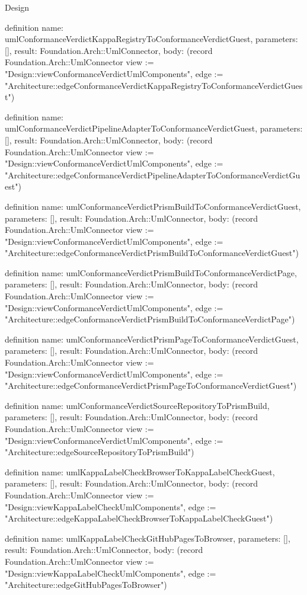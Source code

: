 \begin{lexlean}{Design}
\begin{semanticmodule}
definition{
  name: umlConformanceVerdictKappaRegistryToConformanceVerdictGuest,
  parameters: [],
  result: Foundation.Arch::UmlConnector,
  body: (record Foundation.Arch::UmlConnector {view := "Design::viewConformanceVerdictUmlComponents", edge := "Architecture::edgeConformanceVerdictKappaRegistryToConformanceVerdictGuest"})
}

definition{
  name: umlConformanceVerdictPipelineAdapterToConformanceVerdictGuest,
  parameters: [],
  result: Foundation.Arch::UmlConnector,
  body: (record Foundation.Arch::UmlConnector {view := "Design::viewConformanceVerdictUmlComponents", edge := "Architecture::edgeConformanceVerdictPipelineAdapterToConformanceVerdictGuest"})
}

definition{
  name: umlConformanceVerdictPrismBuildToConformanceVerdictGuest,
  parameters: [],
  result: Foundation.Arch::UmlConnector,
  body: (record Foundation.Arch::UmlConnector {view := "Design::viewConformanceVerdictUmlComponents", edge := "Architecture::edgeConformanceVerdictPrismBuildToConformanceVerdictGuest"})
}

definition{
  name: umlConformanceVerdictPrismBuildToConformanceVerdictPage,
  parameters: [],
  result: Foundation.Arch::UmlConnector,
  body: (record Foundation.Arch::UmlConnector {view := "Design::viewConformanceVerdictUmlComponents", edge := "Architecture::edgeConformanceVerdictPrismBuildToConformanceVerdictPage"})
}

definition{
  name: umlConformanceVerdictPrismPageToConformanceVerdictGuest,
  parameters: [],
  result: Foundation.Arch::UmlConnector,
  body: (record Foundation.Arch::UmlConnector {view := "Design::viewConformanceVerdictUmlComponents", edge := "Architecture::edgeConformanceVerdictPrismPageToConformanceVerdictGuest"})
}

definition{
  name: umlConformanceVerdictSourceRepositoryToPrismBuild,
  parameters: [],
  result: Foundation.Arch::UmlConnector,
  body: (record Foundation.Arch::UmlConnector {view := "Design::viewConformanceVerdictUmlComponents", edge := "Architecture::edgeSourceRepositoryToPrismBuild"})
}

definition{
  name: umlKappaLabelCheckBrowserToKappaLabelCheckGuest,
  parameters: [],
  result: Foundation.Arch::UmlConnector,
  body: (record Foundation.Arch::UmlConnector {view := "Design::viewKappaLabelCheckUmlComponents", edge := "Architecture::edgeKappaLabelCheckBrowserToKappaLabelCheckGuest"})
}

definition{
  name: umlKappaLabelCheckGitHubPagesToBrowser,
  parameters: [],
  result: Foundation.Arch::UmlConnector,
  body: (record Foundation.Arch::UmlConnector {view := "Design::viewKappaLabelCheckUmlComponents", edge := "Architecture::edgeGitHubPagesToBrowser"})
}


\end{semanticmodule}
\end{lexlean}
